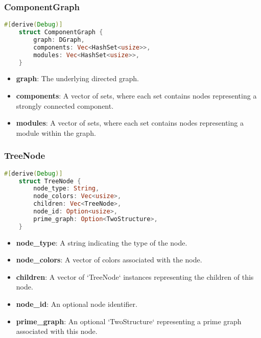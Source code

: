\subsubsection{ComponentGraph}

\begin{lstlisting}[language=Rust, style=rust, caption={Defining the Component Graph}, label={lst:rust-define-component-graph}, firstnumber=1]
    #[derive(Debug)]
    struct ComponentGraph {
        graph: DGraph,
        components: Vec<HashSet<usize>>,
        modules: Vec<HashSet<usize>>,
    }
\end{lstlisting}

\begin{itemize}
    \item \textbf{graph}: The underlying directed graph.
    \item \textbf{components}: A vector of sets, where each set contains nodes representing a strongly connected component.
    \item \textbf{modules}: A vector of sets, where each set contains nodes representing a module within the graph.
\end{itemize}

\subsubsection{TreeNode}

\begin{lstlisting}[language=Rust, style=rust, caption={Defining the TreeNode}, label={lst:rust-define-treenode}, firstnumber=1]
    #[derive(Debug)]
    struct TreeNode {
        node_type: String,
        node_colors: Vec<usize>,
        children: Vec<TreeNode>,
        node_id: Option<usize>,
        prime_graph: Option<TwoStructure>,
    }
\end{lstlisting}

\begin{itemize}
    \item \textbf{node\_type}: A string indicating the type of the node.
    \item \textbf{node\_colors}: A vector of colors associated with the node.
    \item \textbf{children}: A vector of `TreeNode` instances representing the children of this node.
    \item \textbf{node\_id}: An optional node identifier.
    \item \textbf{prime\_graph}: An optional `TwoStructure` representing a prime graph associated with this node.
\end{itemize}

